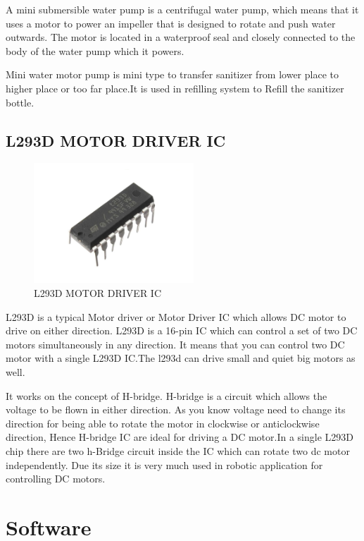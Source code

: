 A mini submersible water pump is a centrifugal water pump, which means that it uses a motor to power an impeller that is designed to rotate and push water outwards. The motor is located in a waterproof seal and closely connected to the body of the water pump which it powers.

Mini water motor pump is mini type to transfer sanitizer from lower place to higher place or too far place.It is used in refilling system to Refill the sanitizer bottle.

\newpage

\subsection{L293D MOTOR DRIVER IC}

	\begin{figure}[h]
		\centering
	\includegraphics[width=60mm,scale=1]{48}
	\caption{L293D MOTOR DRIVER IC}
	\label{L293D MOTOR DRIVER IC}
	
\end{figure}

L293D is a typical Motor driver or Motor Driver IC which allows DC motor to drive on either direction. L293D is a 16-pin IC which can control a set of two DC motors simultaneously in any direction. It means that you can control two DC motor with a single L293D IC.The l293d can drive small and quiet big motors as well.

It works on the concept of H-bridge. H-bridge is a circuit which allows the voltage to be flown in either direction. As you know voltage need to change its direction for being able to rotate the motor in clockwise or anticlockwise direction, Hence H-bridge IC are ideal for driving a DC motor.In a single L293D chip there are two h-Bridge circuit inside the IC which can rotate two dc motor independently. Due its size it is very much used in robotic application for controlling DC motors.

\newpage

\section{Software}
